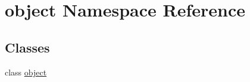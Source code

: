 \hypertarget{namespaceobject}{
\section{object Namespace Reference}
\label{namespaceobject}
}
\subsection*{Classes}
\begin{DoxyCompactItemize}
\item 
class \hyperlink{classobject_1_1object}{object}
\end{DoxyCompactItemize}

